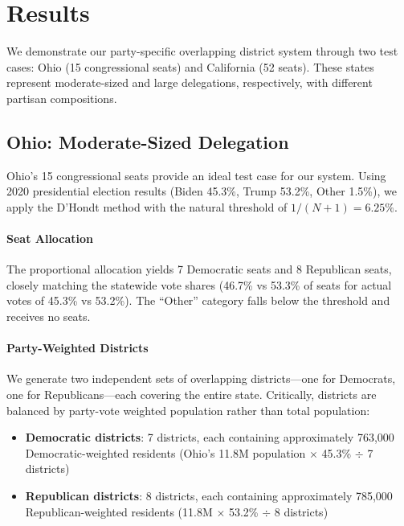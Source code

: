 
\section{Results}

We demonstrate our party-specific overlapping district system through two test cases: Ohio (15 congressional seats) and California (52 seats). These states represent moderate-sized and large delegations, respectively, with different partisan compositions.

\subsection{Ohio: Moderate-Sized Delegation}

Ohio's 15 congressional seats provide an ideal test case for our system. Using 2020 presidential election results (Biden 45.3\%, Trump 53.2\%, Other 1.5\%), we apply the D'Hondt method with the natural threshold of $1/(N+1) = 6.25\%$.

\paragraph{Seat Allocation}
The proportional allocation yields 7 Democratic seats and 8 Republican seats, closely matching the statewide vote shares (46.7\% vs 53.3\% of seats for actual votes of 45.3\% vs 53.2\%). The ``Other'' category falls below the threshold and receives no seats.

\paragraph{Party-Weighted Districts}
We generate two independent sets of overlapping districts---one for Democrats, one for Republicans---each covering the entire state. Critically, districts are balanced by party-vote weighted population rather than total population:

\begin{itemize}
    \item \textbf{Democratic districts}: 7 districts, each containing approximately 763,000 Democratic-weighted residents (Ohio's 11.8M population $\times$ 45.3\% $\div$ 7 districts)
    \item \textbf{Republican districts}: 8 districts, each containing approximately 785,000 Republican-weighted residents (11.8M $\times$ 53.2\% $\div$ 8 districts)
\end{itemize}

